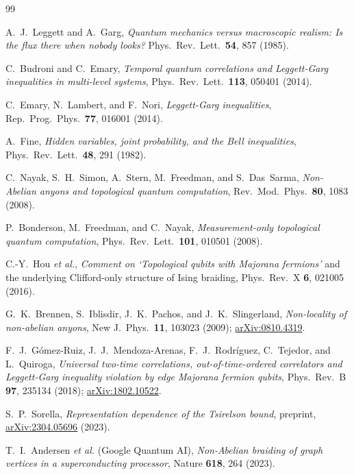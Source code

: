 \documentclass[aps,prx,reprint,amsmath,amssymb,floatfix,nofootinbib,superscriptaddress]{revtex4-2}
\begin{document}
\begin{thebibliography}{99}

A.~J.~Leggett and A.~Garg,
\emph{Quantum mechanics versus macroscopic realism: Is the flux there when nobody looks?}
Phys.\ Rev.\ Lett.\ \textbf{54}, 857 (1985).

C.~Budroni and C.~Emary,
\emph{Temporal quantum correlations and Leggett-Garg inequalities in multi-level systems},
Phys.\ Rev.\ Lett.\ \textbf{113}, 050401 (2014).

C.~Emary, N.~Lambert, and F.~Nori,
\emph{Leggett-Garg inequalities},
Rep.\ Prog.\ Phys.\ \textbf{77}, 016001 (2014).

A.~Fine,
\emph{Hidden variables, joint probability, and the Bell inequalities},
Phys.\ Rev.\ Lett.\ \textbf{48}, 291 (1982).

C.~Nayak, S.~H.~Simon, A.~Stern, M.~Freedman, and S.~Das~Sarma,
\emph{Non-Abelian anyons and topological quantum computation},
Rev.\ Mod.\ Phys.\ \textbf{80}, 1083 (2008).

P.~Bonderson, M.~Freedman, and C.~Nayak,
\emph{Measurement-only topological quantum computation},
Phys.\ Rev.\ Lett.\ \textbf{101}, 010501 (2008).

C.-Y.~Hou \emph{et al.},
\emph{Comment on `Topological qubits with Majorana fermions'} and the
underlying Clifford-only structure of Ising braiding,
Phys.\ Rev.\ X \textbf{6}, 021005 (2016).

G.~K.~Brennen, S.~Iblisdir, J.~K.~Pachos, and J.~K.~Slingerland,
\emph{Non-locality of non-abelian anyons},
New J.\ Phys.\ \textbf{11}, 103023 (2009);
\href{https://arxiv.org/abs/0810.4319}{arXiv:0810.4319}.

F.~J.~G\'omez-Ruiz, J.~J.~Mendoza-Arenas, F.~J.~Rodr\'iguez,
C.~Tejedor, and L.~Quiroga,
\emph{Universal two-time correlations, out-of-time-ordered
correlators and Leggett-Garg inequality violation by edge Majorana
fermion qubits},
Phys.\ Rev.\ B \textbf{97}, 235134 (2018);
\href{https://arxiv.org/abs/1802.10522}{arXiv:1802.10522}.

S.~P.~Sorella,
\emph{Representation dependence of the Tsirelson bound},
preprint, \href{https://arxiv.org/abs/2304.05696}{arXiv:2304.05696} (2023).

T.~I.~Andersen \emph{et al.} (Google Quantum AI),
\emph{Non-Abelian braiding of graph vertices in a superconducting processor},
Nature \textbf{618}, 264 (2023).


\end{thebibliography}
\end{document}
